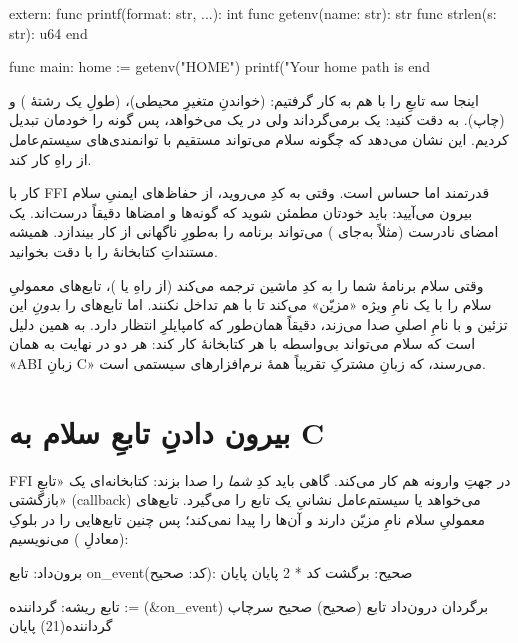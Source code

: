 \begin{salamen}
extern:
    func printf(format: str, ...): int
    func getenv(name: str): str
    func strlen(s: str): u64
end

func main:
    home := getenv("HOME")
    printf("Your home path is %
end
\end{salamen}

اینجا سه تابعِ  را با هم به کار گرفتیم:  (خواندنِ متغیرِ
محیطی)،  (طولِ یک رشتهٔ ) و  (چاپ). به  دقت کنید:
 یک  برمی‌گرداند ولی  در 
یک  می‌خواهد، پس گونه را خودمان تبدیل کردیم. این نشان
می‌دهد که چگونه سلام می‌تواند مستقیم با توانمندی‌های سیستم‌عامل از راهِ 
کار کند.

\begin{warn}
کار با FFI قدرتمند اما حساس است. وقتی به کدِ  می‌روید، از حفاظ‌های ایمنیِ
سلام بیرون می‌آیید: باید خودتان مطمئن شوید که گونه‌ها و امضاها دقیقاً درست‌اند.
یک امضای نادرست (مثلاً  به‌جای ) می‌تواند برنامه را به‌طورِ
ناگهانی از کار بیندازد. همیشه مستنداتِ کتابخانهٔ  را با دقت بخوانید.
\end{warn}

\begin{deep}
وقتی سلام برنامهٔ شما را به کدِ ماشین ترجمه می‌کند (از راهِ  یا
)، تابع‌های معمولیِ سلام را با یک
نامِ ویژه «مزیّن» می‌کند تا با هم تداخل نکنند. اما تابع‌های  را
\emph{بدونِ} این تزئین و با نامِ اصلیِ  صدا می‌زند، دقیقاً همان‌طور که
کامپایلرِ  انتظار دارد. به همین دلیل است که سلام می‌تواند بی‌واسطه با هر
کتابخانهٔ  کار کند: هر دو در نهایت به همان «ABIِ زبانِ C» می‌رسند، که
زبانِ مشترکِ تقریباً همهٔ نرم‌افزارهای سیستمی است.
\end{deep}

\section{بیرون دادنِ تابعِ سلام به C}

FFI در جهتِ وارونه هم کار می‌کند. گاهی  باید کدِ \emph{شما} را صدا بزند:
کتابخانه‌ای یک «تابعِ بازگشتی» (callback) می‌خواهد یا سیستم‌عامل نشانیِ یک تابع
را می‌گیرد. تابع‌های معمولیِ سلام نامِ مزیّن دارند و  آن‌ها را پیدا نمی‌کند؛
پس چنین تابع‌هایی را در بلوکِ  (معادلِ ) می‌نویسیم:

\begin{salamfa}
برون‌داد:
    تابع on_event(کد: صحیح): صحیح:
        برگشت کد * 2
    پایان
پایان

تابع ریشه:
    گرداننده := (&on_event) برگردان درون‌داد تابع (صحیح) صحیح
    سرچاپ گرداننده(21)
پایان
\end{salamfa}

